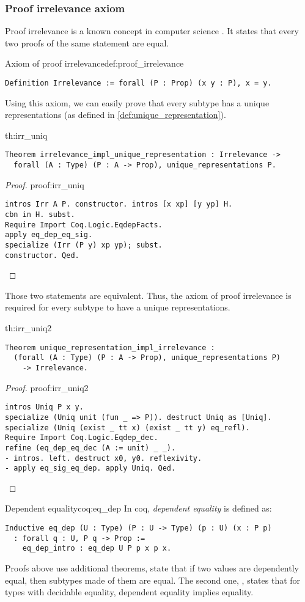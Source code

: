 \subsubsection{Proof irrelevance axiom}
Proof irrelevance is a known concept in computer science \cite{ProofIrrelevance}. It states that every two proofs of the same statement are equal.
\begin{defi}{Axiom of proof irrelevance}{def:proof_irrelevance}
\begin{verbatim}
Definition Irrelevance := forall (P : Prop) (x y : P), x = y.
\end{verbatim}
\end{defi}
Using this axiom, we can easily prove that every subtype has a unique representations (as defined in \ref{def:unique_representation}).
\begin{theo}{}{th:irr_uniq}
    \begin{verbatim}
Theorem irrelevance_impl_unique_representation : Irrelevance -> 
  forall (A : Type) (P : A -> Prop), unique_representations P.
    \end{verbatim}
\end{theo}
\begin{proof}{}{proof:irr_uniq}
    \begin{verbatim}
intros Irr A P. constructor. intros [x xp] [y yp] H.
cbn in H. subst.
Require Import Coq.Logic.EqdepFacts.
apply eq_dep_eq_sig.
specialize (Irr (P y) xp yp); subst.
constructor. Qed.
\end{verbatim}
\end{proof}
Those two statements are equivalent. Thus, the axiom of proof irrelevance is required for every subtype to have a unique representations.
\begin{theo}{}{th:irr_uniq2}
    \begin{verbatim}
Theorem unique_representation_impl_irrelevance : 
  (forall (A : Type) (P : A -> Prop), unique_representations P) 
    -> Irrelevance.
    \end{verbatim}
\end{theo}
\begin{proof}{}{proof:irr_uniq2}
    \begin{verbatim}
intros Uniq P x y.
specialize (Uniq unit (fun _ => P)). destruct Uniq as [Uniq].
specialize (Uniq (exist _ tt x) (exist _ tt y) eq_refl).
Require Import Coq.Logic.Eqdep_dec.
refine (eq_dep_eq_dec (A := unit) _ _).
- intros. left. destruct x0, y0. reflexivity.
- apply eq_sig_eq_dep. apply Uniq. Qed.
\end{verbatim}
\end{proof}
\begin{coq}{Dependent equality}{coq:eq_dep}
In coq, \emph{dependent equality} is defined as:
\begin{verbatim}
Inductive eq_dep (U : Type) (P : U -> Type) (p : U) (x : P p) 
  : forall q : U, P q -> Prop :=
    eq_dep_intro : eq_dep U P p x p x.
\end{verbatim}
Proofs above use additional theorems,  state that if two values are dependently equal, then subtypes made of them are equal. The second one, , states that for types with decidable equality, dependent equality implies equality.
\end{coq}

